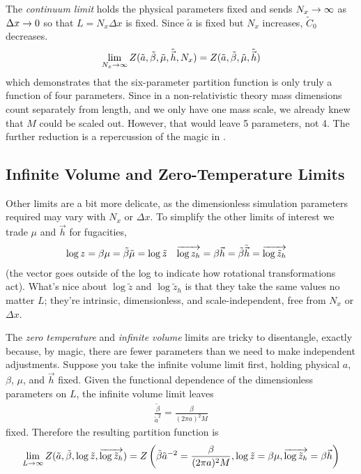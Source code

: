 The \emph{continuum limit} holds the physical parameters fixed and sends $N_x \rightarrow \infty$ as $\Delta x\rightarrow 0$ so that $L=N_x \Delta x$ is fixed.
Since $\tilde{a}$ is fixed but $N_x$ increases, $\tilde{C}_0$ decreases.
\begin{align}
    \lim_{N_x\rightarrow\infty} Z(\tilde{a}, \tilde{\beta}, \tilde{\mu}, \tilde{\vec{h}}, N_x) = Z(\tilde{a}, \tilde{\beta}, \tilde{\mu}, \tilde{\vec{h}})
\end{align}
which demonstrates that the six-parameter partition function is only truly a function of four parameters.
Since in a non-relativistic theory mass dimensions count separately from length, and we only have one mass scale, we already knew that $M$ could be scaled out.
However, that would leave 5 parameters, not 4.
The further reduction is a repercussion of the magic in .

\subsection{Infinite Volume and Zero-Temperature Limits}\label{sec:thermodynamic limit}

Other limits are a bit more delicate, as the dimensionless simulation parameters required may vary with $N_x$ or $\Delta x$.
To simplify the other limits of interest we trade $\mu$ and $\vec{h}$ for fugacities,
\begin{align}
    \log z &= \beta \mu = \tilde{\beta} \tilde{\mu} = \log \tilde{z}
    &
    \overrightarrow{\log z_h} &= \beta \vec{h} = \tilde{\beta}\tilde{\vec{h}} = \overrightarrow{\log \tilde{z}_h}
\end{align}
(the vector goes outside of the log to indicate how rotational transformations act).
What's nice about $\log \tilde{z}$ and $\log \tilde{z}_h$ is that they take the same values no matter $L$; they're intrinsic, dimensionless, and scale-independent, free from $N_x$ or $\Delta x$.

The \emph{zero temperature} and \emph{infinite volume} limits are tricky to disentangle, exactly because, by magic, there are fewer parameters than we need to make independent adjustments.
Suppose you take the infinite volume limit first, holding physical $a$, $\beta$, $\mu$, and $\vec{h}$ fixed.
Given the functional dependence of the dimensionless parameters on $L$, the infinite volume limit leaves
\begin{align}
    \frac{\tilde{\beta}}{\tilde{a}^2} = \frac{\beta}{(2\pi a)^2 M}
\end{align}
fixed.
Therefore the resulting partition function is
\begin{align}
    \lim_{L\rightarrow\infty} Z(\tilde{a}, \tilde{\beta}, \log\tilde{z}, \overrightarrow{\log \tilde{z}_h})
    =
    Z\left(
        \tilde{\beta}\tilde{a}^{-2} = \frac{\beta}{(2\pi a)^2 M},
        \log\tilde{z} = \beta \mu,
        \overrightarrow{\log \tilde{z}_h} = \beta \vec{h}
        \right)
    \label{eq:infinite volume}
\end{align}

